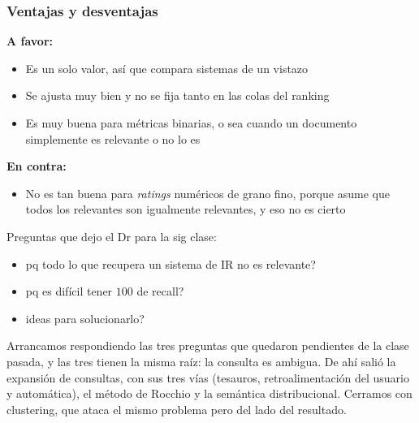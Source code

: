 \documentclass[11pt,letterpaper]{article}
\begin{document}
\subsubsection*{Ventajas y desventajas}

\textbf{A favor:}
\begin{itemize}[itemsep=0.1em]
    \item Es un solo valor, así que compara sistemas de un vistazo
    \item Se ajusta muy bien y no se fija tanto en las colas del
          ranking
    \item Es muy buena para métricas binarias, o sea cuando un
          documento simplemente es relevante o no lo es
\end{itemize}

\textbf{En contra:}
\begin{itemize}[itemsep=0.1em]
    \item No es tan buena para \emph{ratings} numéricos de grano
          fino, porque asume que todos los relevantes son igualmente
          relevantes, y eso no es cierto
\end{itemize}

\begin{pendiente}
    Preguntas que dejo el Dr para la sig clase: 
    \begin{itemize}
        \item pq todo lo que recupera un sistema de IR no es relevante?
        \item pq es difícil tener $100$ de recall?
        \item ideas para solucionarlo?
    \end{itemize}
\end{pendiente}

\newpage


\begin{quick_sum}
    Arrancamos respondiendo las tres preguntas que quedaron pendientes
    de la clase pasada, y las tres tienen la misma raíz: la consulta es
    ambigua. De ahí salió la expansión de consultas, con sus tres vías
    (tesauros, retroalimentación del usuario y automática), el método
    de Rocchio y la semántica distribucional. Cerramos con clustering,
    que ataca el mismo problema pero del lado del resultado.
\end{quick_sum}
\end{document}
